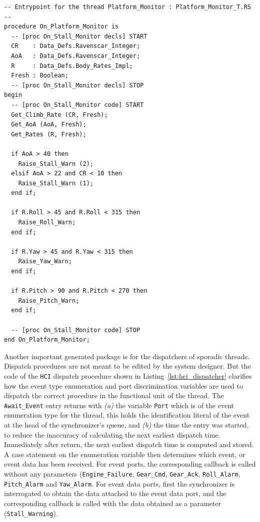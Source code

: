 \begin{minipage}{\listingwidth}
\lstset{language=ada}
\begin{lstlisting}[label=lst:platform_monitor,caption=Procedure called
    when \texttt{Platform\_Monitor} is dispatched]
-- Entrypoint for the thread Platform_Monitor : Platform_Monitor_T.RS --
procedure On_Platform_Monitor is
  -- [proc On_Stall_Monitor decls] START
  CR    : Data_Defs.Ravenscar_Integer;
  AoA   : Data_Defs.Ravenscar_Integer;
  R     : Data_Defs.Body_Rates_Impl;
  Fresh : Boolean;
  -- [proc On_Stall_Monitor decls] STOP
begin
  -- [proc On_Stall_Monitor code] START
  Get_Climb_Rate (CR, Fresh);
  Get_AoA (AoA, Fresh);
  Get_Rates (R, Fresh);

  if AoA > 40 then
    Raise_Stall_Warn (2);
  elsif AoA > 22 and CR < 10 then
    Raise_Stall_Warn (1);
  end if;

  if R.Roll > 45 and R.Roll < 315 then
    Raise_Roll_Warn;
  end if;

  if R.Yaw > 45 and R.Yaw < 315 then
    Raise_Yaw_Warn;
  end if;

  if R.Pitch > 90 and R.Pitch < 270 then
    Raise_Pitch_Warn;
  end if;

  -- [proc On_Stall_Monitor code] STOP
end On_Platform_Monitor;
\end{lstlisting}
\end{minipage}

Another important generated package is for the dispatchers of sporadic
threads. Dispatch procedures are not meant to be edited by the system
designer. But the code of the \texttt{HCI} dispatch procedure shown in
Listing~\ref{lst:hci_dispatcher} clarifies how the event type
enumeration and port discrimination variables are used to dispatch the
correct procedure in the functional unit of the thread. The
\texttt{Await\_Event} entry returns with \emph{(a)} the variable
\texttt{Port} which is of the event enumeration type for the thread,
this holds the identification literal of the event at the head of the
synchronizer's queue, and \emph{(b)} the time the entry was started,
to reduce the inaccuracy of calculating the next earliest dispatch
time. Immediately after return, the next earliest dispatch time is
computed and stored. A case statement on the enumeration variable then
determines which event, or event data has been received. For event
ports, the corresponding callback is called without any parameters
(\texttt{Engine\_Failure}, \texttt{Gear\_Cmd}, \texttt{Gear\_Ack},
\texttt{Roll\_Alarm}, \texttt{Pitch\_Alarm} and
\texttt{Yaw\_Alarm}. For event data ports, first the synchronizer is
interrogated to obtain the data attached to the event data port, and
the corresponding callback is called with the data obtained as a
parameter (\texttt{Stall\_Warning}).

